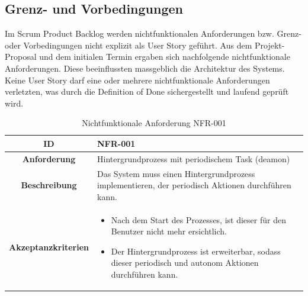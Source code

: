 \documentclass[a4paper,12pt]{report}
\begin{document}
    \newpage

    \subsection{Grenz- und Vorbedingungen}
    Im Scrum Product Backlog werden nichtfunktionalen Anforderungen bzw. Grenz- oder Vorbedingungen nicht explizit als User Story geführt. Aus dem Projekt-Proposal und dem initialen Termin ergaben sich nachfolgende nichtfunktionale Anforderungen.
    Diese beeinflussten massgeblich die Architektur des Systems. Keine User Story darf eine oder mehrere nichtfunktionale Anforderungen verletzten, was durch die Definition of Done sichergestellt und laufend geprüft wird.

    \begin{table}[h!]
        \centering
        \setlength{\leftmargini}{0.4cm}
        \begin{tabular}{|c|p{10cm}|}
            \hline
            \textbf{ID}           & NFR-001                                                                                            \\ \hline
            \textbf{Anforderung}  & Hintergrundprozess mit periodischem Task (deamon)                                                  \\ \hline
            \textbf{Beschreibung} & Das System muss einen Hintergrundprozess implementieren, der periodisch Aktionen durchführen kann. \\ \hline
            \textbf{Akzeptanzkriterien} &
            \begin{itemize}
                \item Nach dem Start des Prozesses, ist dieser für den Benutzer nicht mehr ersichtlich.
                \item Der Hintergrundprozess ist erweiterbar, sodass dieser periodisch und autonom Aktionen durchführen kann.
            \end{itemize}
            \\ \hline
        \end{tabular}
        \caption{Nichtfunktionale Anforderung NFR-001}\label{tab:nfr-1}
    \end{table}
\end{document}
